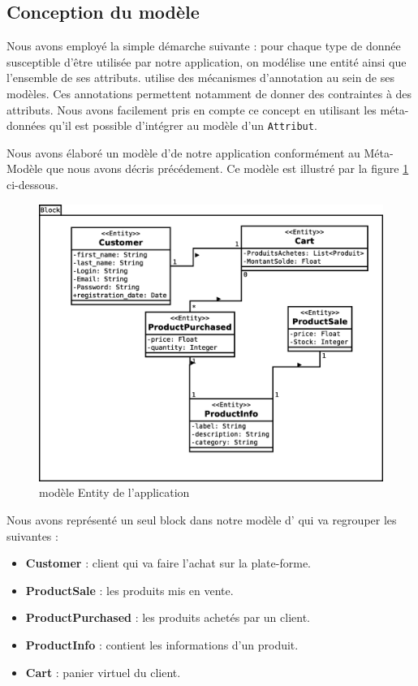 \subsection{Conception du modèle}

Nous avons employé la simple démarche suivante : pour chaque type de donnée susceptible d'être utilisée par notre application, on modélise une entité ainsi que l'ensemble de ses attributs. 
\kwplay{} utilise des mécanismes d'annotation au sein de ses modèles. Ces annotations permettent notamment de donner des contraintes à des attributs. Nous avons facilement pris en compte ce concept en utilisant les méta-données qu'il est possible d'intégrer au modèle d'un \verb+Attribut+.

Nous avons élaboré un modèle d'\kwentity de notre application conformément au Méta-Modèle que nous avons décris précédement. Ce modèle est illustré par la figure \ref{fig:entMod} ci-dessous.

\begin{figure}[h]
  \centering
  \includegraphics[scale=.4]{img/Entitymodel.eps}
  \caption{modèle Entity de l'application}
  \label{fig:entMod}
\end{figure}

Nous avons représenté un seul block dans notre modèle d'\kwentity{} qui va regrouper les \kwentity{} suivantes :  

\begin{itemize}
  \item[\textbullet] \textbf{Customer} :  client qui va faire l'achat sur la plate-forme.
  \item[\textbullet] \textbf{ProductSale} : les produits mis en vente.
  \item[\textbullet] \textbf{ProductPurchased} : les produits achetés par un client.
  \item[\textbullet] \textbf{ProductInfo} : contient les informations d'un produit.
  \item[\textbullet] \textbf{Cart} : panier virtuel du client.
\end{itemize}

